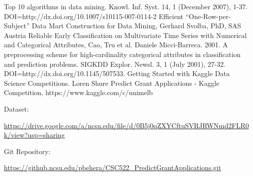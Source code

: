 \documentclass{article} %
\begin{document}
	\begin{thebibliography}{10} %
		 Top 10 algorithms in data mining. Knowl. Inf. Syst. 14, 1 (December 2007), 1-37. DOI=http://dx.doi.org/10.1007/s10115-007-0114-2
		 Efficient “One-Row-per-Subject” Data Mart Construction for Data Mining, Gerhard Svolba, PhD, SAS Austria
		 Reliable Early Classification on Multivariate Time Series with Numerical and Categorical Attributes, Cao, Tru et al.
		Daniele Micci-Barreca. 2001. A preprocessing scheme for high-cardinality categorical attributes in classification and prediction problems. SIGKDD Explor. Newsl. 3, 1 (July 2001), 27-32. DOI=http://dx.doi.org/10.1145/507533.
		 Getting Started with Kaggle Data Science Competitions. Loren Shure
		 Predict Grant Applications - Kaggle Competition, https://www.kaggle.com/c/unimelb 
	\end{thebibliography}
	
	Dataset:
	
	\url{https://drive.google.com/a/ncsu.edu/file/d/0B5j0qZXYCftuSVRJRWNmd2FLR0k/view?usp=sharing}
	
	Git Repository:
	
	\url{https://github.ncsu.edu/pbehera/CSC522_PredictGrantApplications.git}
	
\end{document}
